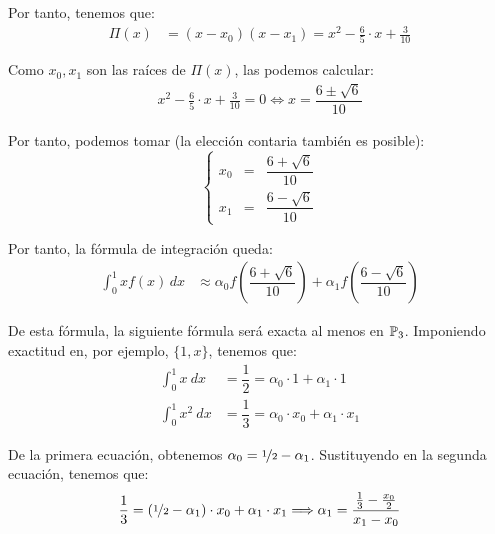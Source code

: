 \begin{ejercicio}
\begin{enumerate}
        Por tanto, tenemos que:
        \begin{align*}
            \Pi(x) &= (x-x_0)(x-x_1) = x^2-\frac{6}{5}\cdot x+\frac{3}{10}
        \end{align*}

        Como $x_0,x_1$ son las raíces de $\Pi(x)$, las podemos calcular:
        \begin{align*}
            x^2-\frac{6}{5}\cdot x+\frac{3}{10} = 0
            \iff x=\dfrac{6\pm\sqrt{6}}{10}
        \end{align*}

        Por tanto, podemos tomar (la elección contaria también es posible):
        \begin{equation*}
            \left\{
                \begin{array}{rcl}
                    x_0 &=& \dfrac{6+\sqrt{6}}{10}\\
                    x_1 &=& \dfrac{6-\sqrt{6}}{10}
                \end{array}
            \right.
        \end{equation*}

        Por tanto, la fórmula de integración queda:
        \begin{align*}
            \int_0^1 xf(x) \, dx &\approx \alpha_0 f\left(\dfrac{6+\sqrt{6}}{10}\right) + \alpha_1 f\left(\dfrac{6-\sqrt{6}}{10}\right)
        \end{align*}

        De esta fórmula, la siguiente fórmula será exacta al menos en $\mathbb{P}_3$. Imponiendo exactitud en, por ejemplo, $\{1,x\}$, tenemos que:
        \begin{align*}
            \int_0^1 x\ dx &= \dfrac{1}{2} = \alpha_0\cdot 1 + \alpha_1\cdot 1\\
            \int_0^1 x^2\ dx &= \dfrac{1}{3} = \alpha_0\cdot x_0 + \alpha_1\cdot x_1
        \end{align*}

        De la primera ecuación, obtenemos $\alpha_0=\nicefrac{1}{2}-\alpha_1$. Sustituyendo en la segunda ecuación, tenemos que:
        \begin{align*}
            \dfrac{1}{3} = \left(\nicefrac{1}{2}-\alpha_1\right)\cdot x_0 + \alpha_1\cdot x_1
            \Longrightarrow
            \alpha_1 = \dfrac{\frac{1}{3}-\frac{x_0}{2}}{x_1-x_0}
        \end{align*}


\end{enumerate}
\end{ejercicio}

